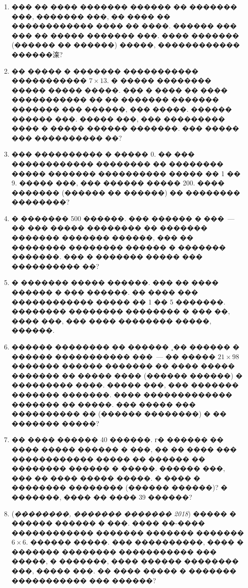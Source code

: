 \documentclass[a4paper,12pt]{article}
\begin{document}
\begin{enumerate}
\item ��� �� ���� ������� ������ �� ������� ���, ������� ���, �� ���� �� ������������ ���� �� ����. ������ ��� ��� �� ����� ������� ���. ���� ������� (������ �� ������) �����, ������������ ������㳿?

\item �� ����� � ������� ����������� ����������� $7\times 13$. � ����� �������� ����� ����� �����. ��� � ���� �� ���� ����������� �� �� ������� ������� ������� ��� ������, ��� �����. ������ ������ ���. ����� ���, ��� ��������� ���� � ����� ������ �������. ��� ����� ��� ���������� ��?

\item ��� ���������� � ����� 0. �� ��� ������������ �������� �� �������� ����� ������� ���������� ����� �� 1 �� 9. ����� ���, ��� ������ ����� 200. ���� ������� (������ �� ������) �� �������� ��������?

\item � ������� 500 ������. ��� ������ � ���~--- �� ��� ����� �������� �� ������� ������� ������� ������, ��� �� �������� �������� ������ � ������� �������. ��� � ������� ����� ��� ���������� ��?

\item � ������� ����� ������. ��� �� ���� ������ � ��� ������. �� ���� ��� ������������ ����� �� 1 �� 5 �������. �������� �������� �������� � ��� ��, ���� ���, ��� ���� �������� �����, ������.

\item  ������ �������� �� ������ ˳�� ������ � ������ ����������� ���~--- �� ����� $21\times 98$ ������� ������ ������� �� ���� ����� ������� �� ����� ���� (������ ������) � ��������� ����. ����� ���, ��� ������� ������� �������. ���� ������������� ������� �� �����. ��� ����� ��� ���������� �� (������ ��������) � �� ������� �����?

\item �� ���� ������ 40 ������. г� ������ �� ���� ����� ������ � ���, �� �� ���� ��� ������������ ����� �� ������ �� �������� ������ � �����. ������ ���, ��� �� ���� ����� �����. � ���� � �������� �������� (������ ������)? � �������, ���� �� ���� 39 ������?

\item (\textit{��������, ������� ������� 2018}) ����� � ������ ������ � ���. ���� ��-���� ������������ ������� ������� ������� $6\times 6$. ������ �����. ��� ����������, ���� � ������� �������� ����������� ��� �����, � �������, ���� ������ �������� ���, ����� ���. �� ���� ����� � ������� ����������� ��� ������?


\end{enumerate}
\end{document}
